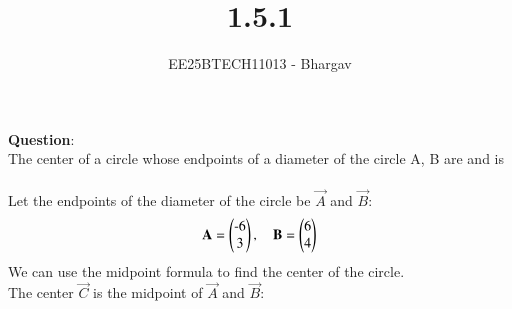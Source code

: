 \documentclass[journal]{IEEEtran}
\begin{document}

\vspace{3cm}

\title{1.5.1}
\author{EE25BTECH11013 - Bhargav}
\maketitle
{\let\newpage\relax\maketitle}

\renewcommand{\thefigure}{\theenumi}
\renewcommand{\thetable}{\theenumi}
\setlength{\intextsep}{10pt} %


\renewcommand{\thetable}{\theenumi}

\textbf{Question}:\\
The center of a circle whose endpoints of a diameter of the circle A, B are  and  is\\ 
\solution \\
Let the endpoints of the diameter of the circle be $\vec{A}$ and $\vec{B}$:
\begin{align}
    \vec{A}=\myvec{$-6$ \\ $3$},\quad
    \vec{B}=\myvec{$6$ \\ $4$}
\end{align}
We can use the midpoint formula to find the center of the circle.\\ 
The center $\vec{C}$ is the midpoint of $\vec{A}$ and $\vec{B}$: \\
\end{document}

